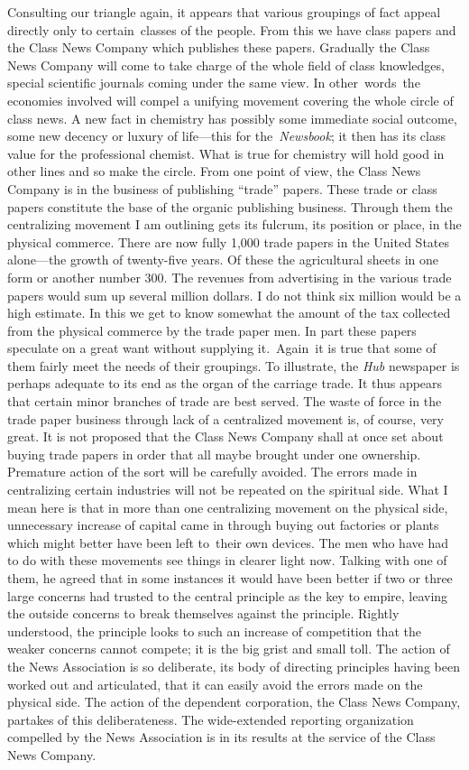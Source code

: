 \documentclass[twoside,symmetric,nobib,justified]{tufte-book}
\begin{document}
Consulting our triangle again, it appears that various groupings of fact
appeal directly only to certain~classes of the people. From this we have
class papers and the Class News Company which publishes these papers.
Gradually the Class News Company will come to take charge of the whole
field of class knowledges, special scientific journals coming under the
same view. In other~words~the economies involved will compel a unifying
movement covering the whole circle of class news. A new fact in
chemistry has possibly some immediate social outcome, some new decency
or luxury of life---this for the~\emph{Newsbook}; it then has its class
value for the professional chemist. What is true for chemistry will hold
good in other lines and so make the circle. From one point of view, the
Class News Company is in the business of publishing ``trade'' papers.
These trade or class papers constitute the base of the organic
publishing business. Through them the centralizing movement I am
outlining gets its fulcrum, its position or place, in the physical
commerce. There are now fully 1,000 trade papers in the United States
alone---the growth of twenty-five years. Of these the agricultural
sheets in one form or another number 300. The revenues from advertising
in the various trade papers would sum up several million dollars. I do
not think six million would be a high estimate. In this we get to know
somewhat the amount of the tax collected from the physical commerce by
the trade paper men. In part these papers speculate on a great want
without supplying it.~Again~it is true that some of them fairly meet the
needs of their groupings. To illustrate, the \emph{Hub} newspaper is
perhaps adequate to its end as the organ of the carriage trade. It thus
appears that certain minor branches of trade are best served. The waste
of force in the trade paper business through lack of a centralized
movement is, of course, very great. It is not proposed that the Class
News Company shall at once set about buying trade papers in order that
all maybe brought under one ownership. Premature action of the sort will
be carefully avoided. The errors made in centralizing certain industries
will not be repeated on the spiritual side. What I mean here is that in
more than one centralizing movement on the physical side, unnecessary
increase of capital came in through buying out factories or plants which
might better have been left to~their own devices. The men who have had
to do with these movements see things in clearer light now. Talking with
one of them, he agreed that in some instances it would have been better
if two or three large concerns had trusted to the central principle as
the key to empire, leaving the outside concerns to break themselves
against the principle. Rightly understood, the principle looks to such
an increase of competition that the weaker concerns cannot compete; it
is the big grist and small toll. The action of the News Association is
so deliberate, its body of directing principles having been worked out
and articulated, that it can easily avoid the errors made on the
physical side. The action of the dependent corporation, the Class News
Company, partakes of this deliberateness. The wide-extended reporting
organization compelled by the News Association is in its results at the
service of the Class News Company.~
\end{document}
